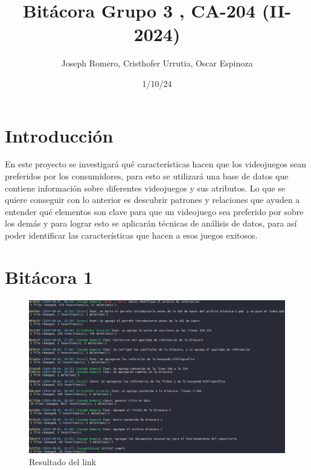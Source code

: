 \documentclass[
  letterpaper,
  DIV=11,
  numbers=noendperiod]{scrreprt}
\title{Bitácora Grupo 3 , CA-204 (II-2024)}
\author{Joseph Romero, Cristhofer Urrutia, Oscar Espinoza}
\date{1/10/24}
\renewcommand*\contentsname{Tabla de contenidos}
\newcommand\contentsname{Tabla de contenidos}
\begin{document}
\maketitle
\ifdefined\Shaded\renewenvironment{Shaded}{\begin{tcolorbox}[frame hidden, sharp corners, borderline west={3pt}{0pt}{shadecolor}, breakable, enhanced, boxrule=0pt, interior hidden]}{\end{tcolorbox}}\fi

\renewcommand*\contentsname{Tabla de contenidos}
{
\hypersetup{linkcolor=}
\setcounter{tocdepth}{2}
\tableofcontents
}

\hypertarget{introducciuxf3n}{%
\chapter*{Introducción}\label{introducciuxf3n}}


En este proyecto se investigará qué características hacen que los
videojuegos sean preferidos por los consumidores, para esto se utilizará
una base de datos que contiene información sobre diferentes videojuegos
y sus atributos. Lo que se quiere conseguir con lo anterior es descubrir
patrones y relaciones que ayuden a entender qué elementos son clave para
que un videojuego sea preferido por sobre los demás y para lograr esto
se aplicarán técnicas de análisis de datos, para así poder identificar
las características que hacen a esos juegos exitosos.


\hypertarget{bituxe1cora-1}{%
\chapter{Bitácora 1}\label{bituxe1cora-1}}

\begin{figure}

{\centering \includegraphics{./imagenes/link-1.png}

}

\caption{Resultado del link}

\end{figure}
\end{document}
